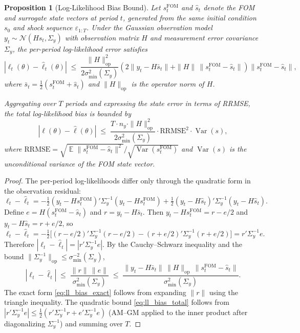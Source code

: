\documentclass[12pt]{article}
\theoremstyle{plain}
\newtheorem{proposition}[theorem]{Proposition}
\theoremstyle{definition}
\theoremstyle{remark}
\DeclareMathOperator{\E}{\mathbb{E}}
\DeclareMathOperator{\Var}{\text{Var}}
\newcommand{\eps}{\varepsilon}
\newcommand{\Sigmay}{\Sigma_y}
\begin{document}
\begin{proposition}[Log-Likelihood Bias Bound]
\label{prop:ll_bias_bound}
Let $s_t^{\text{FOM}}$ and $\hat{s}_t$ denote the FOM and surrogate state vectors at period $t$, generated from the same initial condition $s_0$ and shock sequence $\eps_{1:T}$. Under the Gaussian observation model $y_t \sim \mathcal{N}(Hs_t, \Sigmay)$ with observation matrix $H$ and measurement error covariance $\Sigmay$, the per-period log-likelihood error satisfies
\begin{equation}
|\ell_t(\theta) - \hat{\ell}_t(\theta)|
  \;\leq\; \frac{\|H\|_{\text{op}}^2}{2\sigma_{\min}^2(\Sigmay)}
    \left(2\|y_t - H\bar{s}_t\| + \|H\|\,\|s_t^{\text{FOM}} -
    \hat{s}_t\|\right)
    \|s_t^{\text{FOM}} - \hat{s}_t\|,
\label{eq:ll_bias_exact}
\end{equation}
where $\bar{s}_t = \tfrac{1}{2}(s_t^{\text{FOM}} + \hat{s}_t)$ and $\|H\|_{\text{op}}$ is the operator norm of $H$.

Aggregating over $T$ periods and expressing the state error in terms of RRMSE, the total log-likelihood bias is bounded by
\begin{equation}
|\ell(\theta) - \hat{\ell}(\theta)|
  \;\leq\; \frac{T \cdot n_y \cdot \|H\|_{\text{op}}^2}{2\sigma_{\min}^2(\Sigmay)}
    \cdot \text{RRMSE}^2 \cdot \Var(s),
\label{eq:ll_bias_total}
\end{equation}
where $\text{RRMSE} = \sqrt{\E\|s_t^{\text{FOM}} - \hat{s}_t\|^2} / \sqrt{\Var(s_t^{\text{FOM}})}$ and $\Var(s)$ is the unconditional variance of the FOM state vector.
\end{proposition}

\begin{proof}
The per-period log-likelihoods differ only through the quadratic form in the observation residual:
\[
\ell_t - \hat{\ell}_t
  = -\tfrac{1}{2}(y_t - Hs_t^{\text{FOM}})'\Sigmay^{-1}(y_t - Hs_t^{\text{FOM}})
    + \tfrac{1}{2}(y_t - H\hat{s}_t)'\Sigmay^{-1}(y_t - H\hat{s}_t).
\]
Define $e = H(s_t^{\text{FOM}} - \hat{s}_t)$ and $r = y_t - H\bar{s}_t$. Then $y_t - Hs_t^{\text{FOM}} = r - e/2$ and $y_t - H\hat{s}_t = r + e/2$, so
\[
\ell_t - \hat{\ell}_t
  = -\tfrac{1}{2}\bigl[(r - e/2)'\Sigmay^{-1}(r - e/2)
    - (r + e/2)'\Sigmay^{-1}(r + e/2)\bigr]
  = r'\Sigmay^{-1}e.
\]
Therefore $|\ell_t - \hat{\ell}_t| = |r'\Sigmay^{-1}e|$. By the Cauchy--Schwarz inequality and the bound $\|\Sigmay^{-1}\|_{\text{op}} \leq \sigma_{\min}^{-2}(\Sigmay)$,
\[
|\ell_t - \hat{\ell}_t|
  \;\leq\; \frac{\|r\|\,\|e\|}{\sigma_{\min}^2(\Sigmay)}
  \;\leq\; \frac{\|y_t - H\bar{s}_t\|\,\|H\|_{\text{op}}\,
    \|s_t^{\text{FOM}} - \hat{s}_t\|}{\sigma_{\min}^2(\Sigmay)}.
\]
The exact form \eqref{eq:ll_bias_exact} follows from expanding $\|r\|$ using the triangle inequality. The quadratic bound \eqref{eq:ll_bias_total} follows from $|r'\Sigmay^{-1}e| \leq \tfrac{1}{2}(r'\Sigmay^{-1}r + e'\Sigmay^{-1}e)$ (AM--GM applied to the inner product after diagonalizing $\Sigmay^{-1}$) and summing over $T$.
\end{proof}
\end{document}
